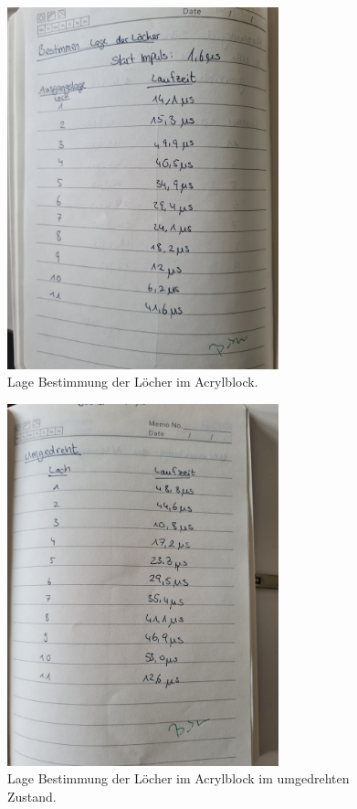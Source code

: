 \begin{figure}
    \centering
    \includegraphics[width=0.7\textwidth]{messwerte/index3.jpg}
    \caption{Lage Bestimmung der Löcher im Acrylblock.}
\end{figure}

\begin{figure}
    \centering
    \includegraphics[width=0.7\textwidth]{messwerte/index4.jpg}
    \caption{Lage Bestimmung der Löcher im Acrylblock im umgedrehten Zustand.}
\end{figure}